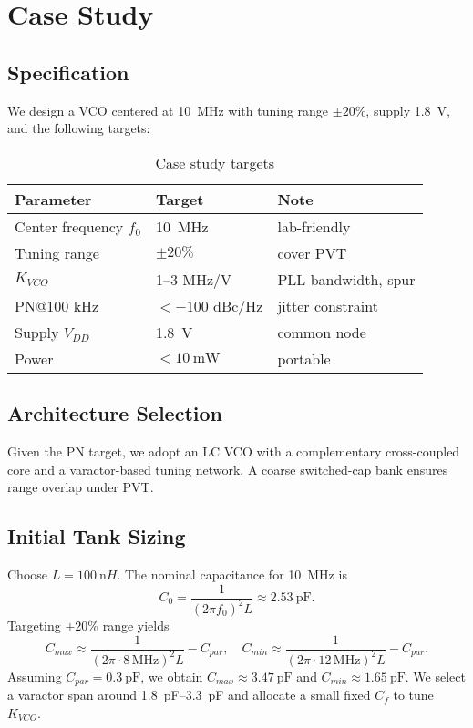 \chapter{Case Study}
\section{Specification}
We design a VCO centered at \SI{10}{\mega\hertz} with tuning range $\pm20\%$, supply \SI{1.8}{\volt}, and the following targets:
\begin{table}[H]
  \centering
  \begin{tabular}{lll}
    \toprule
    Parameter & Target & Note \\
    \midrule
    Center frequency $f_0$ & \SI{10}{\mega\hertz} & lab-friendly \\
    Tuning range & $\pm20\%$ & cover PVT \\
    $K_{VCO}$ & 1--3 \si{\mega Hz/V} & PLL bandwidth, spur \\
    PN@100 kHz & $< -100$ dBc/Hz & jitter constraint \\
    Supply $V_{DD}$ & \SI{1.8}{\volt} & common node \\
    Power & $< \SI{10}{\milli\watt}$ & portable \\
    \bottomrule
  \end{tabular}
  \caption{Case study targets}
\end{table}

\section{Architecture Selection}
Given the PN target, we adopt an LC VCO with a complementary cross-coupled core and a varactor-based tuning network. A coarse switched-cap bank ensures range overlap under PVT.

\section{Initial Tank Sizing}
Choose $L = \SI{100}{\nano H}$. The nominal capacitance for \SI{10}{\mega\hertz} is
\[
 C_0 = \frac{1}{(2\pi f_0)^2 L} \approx \SI{2.53}{\pF}.
\]
Targeting $\pm20\%$ range yields
\[
 C_{max} \approx \frac{1}{(2\pi\cdot 8\,\mathrm{MHz})^2 L} - C_{par},\quad
 C_{min} \approx \frac{1}{(2\pi\cdot 12\,\mathrm{MHz})^2 L} - C_{par}.
\]
Assuming $C_{par}=\SI{0.3}{\pF}$, we obtain $C_{max}\approx \SI{3.47}{\pF}$ and $C_{min}\approx \SI{1.65}{\pF}$. We select a varactor span around \SIrange{1.8}{3.3}{\pF} and allocate a small fixed $C_f$ to tune $K_{VCO}$.

